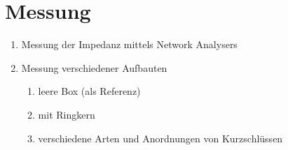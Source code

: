 \section{Messung}
    \begin{enumerate}
        \item Messung der Impedanz mittels Network Analysers
        \item Messung verschiedener Aufbauten
            \begin{enumerate}
                \item leere Box (als Referenz)
                \item mit Ringkern
                \item verschiedene Arten und Anordnungen von Kurzschlüssen
            \end{enumerate}
    \end{enumerate}